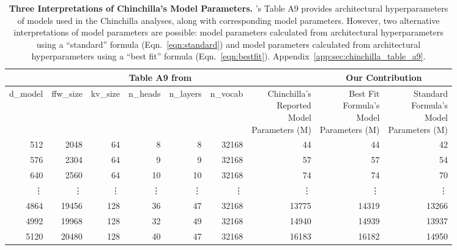 \begin{table}[t]
\centering
\setlength{\tabcolsep}{3pt}
\footnotesize
\begin{tabular}{rrrrrr|r|rr}
\toprule
\multicolumn{7}{c|}{Table A9 from \citet{hoffman2022chinchilla}} & \multicolumn{2}{c}{Our Contribution} \\
\midrule
d\_model &  ffw\_size &  kv\_size &  n\_heads &  n\_layers & n\_vocab & \makecell{Chinchilla's\\Reported\\Model\\Parameters (M)} & \makecell{Best Fit\\Formula's\\Model\\ Parameters (M)} & \makecell{Standard\\Formula's\\Model\\Parameters (M)}\\
\midrule
    512 & 2048 & 64 & 8 & 8 & 32168 & 44 & 44 & 42 \\ 
    576 & 2304 & 64 & 9 & 9 & 32168 & 57 & 57 & 54 \\ 
    640 & 2560 & 64 & 10 & 10 & 32168 & 74 & 74 & 70 \\ 
    \vdots & \vdots & \vdots & \vdots & \vdots & \vdots & \vdots & \vdots & \vdots\\
    4864 & 19456 & 128 & 36 & 47 & 32168 & 13775 & 14319 & 13266 \\ 
    4992 & 19968 & 128 & 32 & 49 & 32168 & 14940 & 14939 & 13937 \\ 
    5120 & 20480 & 128 & 40 & 47 & 32168 & 16183 & 16182 & 14950 \\ 
\bottomrule
\end{tabular}
\caption{\textbf{Three Interpretations of Chinchilla's Model Parameters.}
\citet{hoffman2022chinchilla}'s Table A9 provides architectural hyperparameters of models used in the Chinchilla analyses, along with corresponding model parameters.
However, two alternative interpretations of model parameters are possible: model parameters calculated from architectural hyperparameters using a ``standard'' formula (Eqn.~\ref{eqn:standard}) and model parameters calculated from architectural hyperparameters using a ``best fit'' formula (Eqn.~\ref{eqn:bestfit}). Appendix~\ref{app:sec:chinchilla_table_a9}.
}
\label{tab:all_models_abridged}
\end{table}


